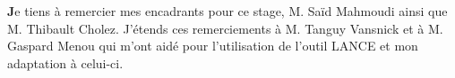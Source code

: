 \textbf Je tiens à remercier mes encadrants pour ce stage, M. Saïd Mahmoudi ainsi que M. Thibault Cholez. J’étends ces remerciements à M. Tanguy Vansnick et à M. Gaspard Menou qui m’ont aidé pour l’utilisation de l’outil LANCE et mon adaptation à celui-ci.
